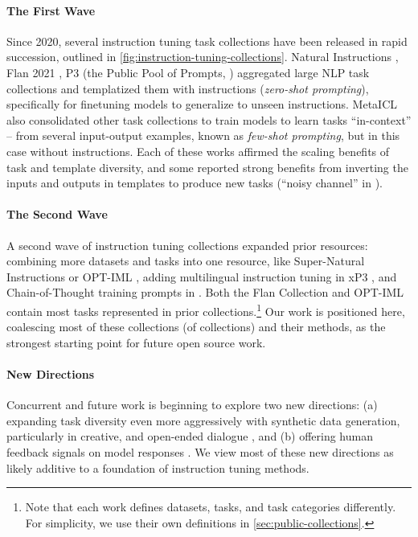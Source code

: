 \paragraph{The First Wave}
Since 2020, several instruction tuning task collections have been released in rapid succession, outlined in \cref{fig:instruction-tuning-collections}.
Natural Instructions \citep{mishra2021cross}, Flan 2021 \citep{wei2021finetuned}, P3 (the Public Pool of Prompts, \citealp{bach-etal-2022-promptsource}) aggregated large NLP task collections and templatized them with instructions (\emph{zero-shot prompting}), specifically for finetuning models to generalize to unseen instructions. %
MetaICL \citep{min-etal-2022-metaicl} also consolidated other task collections \citep{ye2021crossfit,khashabi-etal-2020-unifiedqa} to train models to learn tasks ``in-context'' -- from several input-output examples, known as \emph{few-shot prompting}, but in this case without instructions.
Each of these works affirmed the scaling benefits of task and template diversity, and some reported strong benefits from inverting the inputs and outputs in templates to produce new tasks (``noisy channel'' in \citealp{min-etal-2022-metaicl}).

\vspace{-2mm}
\paragraph{The Second Wave}
A second wave of instruction tuning collections expanded prior resources: combining more datasets and tasks into one resource, like Super-Natural Instructions \citep{wang2022benchmarking} or OPT-IML \citep{iyer2022optiml}, adding multilingual instruction tuning in xP3 \citep{muennighoff2022crosslingual}, and Chain-of-Thought training prompts in \flantwo{} \citep{chung2022scaling}.
Both the Flan Collection and OPT-IML contain most tasks represented in prior collections.\footnote{Note that each work defines datasets, tasks, and task categories differently. For simplicity, we use their own definitions in \cref{sec:public-collections}.}
Our work is positioned here, coalescing most of these collections (of collections) and their methods, as the strongest starting point for future open source work.

\vspace{-2mm}
\paragraph{New Directions}
Concurrent and future work is beginning to explore two new directions: (a) expanding task diversity even more aggressively with synthetic data generation, particularly in creative, and open-ended dialogue \citep{selfinstruct2022, honovich2022unnatural, ye2022guess, gupta2022improving}, and (b) offering human feedback signals on model responses \citep{ouyang2022training, glaese2022improving, bai2022training, nakano2021webgpt, bai2022constitutional}.
We view most of these new directions as likely additive to a foundation of instruction tuning methods.


